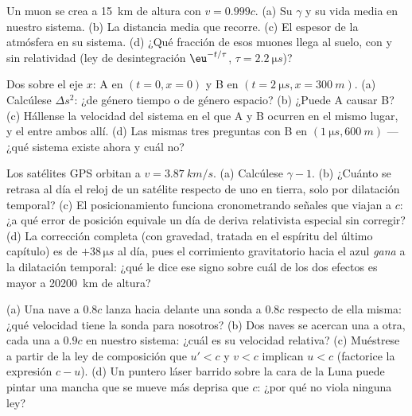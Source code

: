 \begin{exercise}[$\star$]\label{exo:b3:relativistic-kinematics:3}
Un muon se crea a \qty{15}{km} de altura con $v = 0.999c$. (a) Su
$\gamma$ y su vida media en nuestro sistema. (b) La distancia media que
recorre. (c) El espesor de la atmósfera en su sistema. (d) ¿Qué fracción de
esos muones llega al suelo, con y sin relatividad (ley de desintegración
$\eu^{-t/\tau}$, $\tau = \qty{2.2}{\micro s}$)?
\end{exercise}

\begin{exercise}[$\star$]\label{exo:b3:relativistic-kinematics:4}
Dos  sobre el eje $x$: A en $(t = 0, x = 0)$ y B en $(t =
\qty{2}{\micro s}, x = \qty{300}{m})$. (a) Calcúlese $\Delta s^2$: ¿de género
tiempo o de género espacio? (b) ¿Puede A causar B? (c) Hállense la velocidad
del sistema en el que A y B ocurren en el mismo lugar, y el 
entre ambos allí. (d) Las mismas tres preguntas con B en
$(\qty{1}{\micro s}, \qty{600}{m})$ --- ¿qué sistema existe ahora y cuál
no?
\end{exercise}

\begin{exercise}[$\star\star$]\label{exo:b3:relativistic-kinematics:5}
Los satélites GPS orbitan a $v = \qty{3.87}{km/s}$. (a) Calcúlese $\gamma -
1$. (b) ¿Cuánto se retrasa al día el reloj de un satélite respecto de uno en
tierra, solo por dilatación temporal? (c) El posicionamiento funciona
cronometrando señales que viajan a $c$: ¿a qué error de posición equivale un
día de deriva relativista especial sin corregir? (d) La corrección completa
(con gravedad, tratada en el espíritu del último capítulo) es de
$+38\,\unit{\micro s}$ al día, pues el corrimiento gravitatorio hacia el
azul \emph{gana} a la dilatación temporal: ¿qué le dice ese signo sobre cuál
de los dos efectos es mayor a \qty{20200}{km} de altura?
\end{exercise}

\begin{exercise}[$\star\star$]\label{exo:b3:relativistic-kinematics:6}
(a) Una nave a $0.8c$ lanza hacia delante una sonda a $0.8c$ respecto de
ella misma: ¿qué velocidad tiene la sonda para nosotros? (b) Dos naves se
acercan una a otra, cada una a $0.9c$ en nuestro sistema: ¿cuál es su
velocidad relativa? (c) Muéstrese a partir de la ley de composición que
$u' < c$ y $v < c$ implican $u < c$ (factorice la expresión $c - u$). (d) Un
puntero láser barrido sobre la cara de la Luna puede pintar una mancha que
se mueve más deprisa que $c$: ¿por qué no viola ninguna ley?
\end{exercise}


